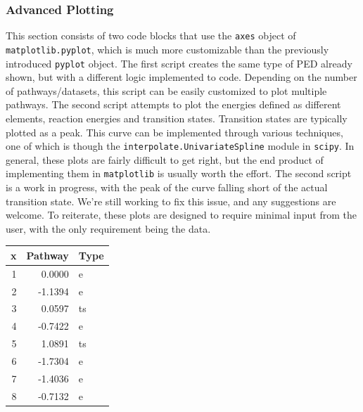 \documentclass[11pt]{article}
\begin{document}
\subsubsection{Advanced Plotting}
\label{sec:org0cb982b}
This section consists of two code blocks that use the \texttt{axes} object of \texttt{matplotlib.pyplot}, which is much more customizable than the previously introduced \texttt{pyplot} object. The first script creates the same type of PED already shown, but with a different logic implemented to code. Depending on the number of pathways/datasets, this script can be easily customized to plot multiple pathways. The second script attempts to plot the energies defined as different elements, reaction energies and transition states. Transition states are typically plotted as a peak. This curve can be implemented through various techniques, one of which is though the \texttt{interpolate.UnivariateSpline} module in \texttt{scipy}. In general, these plots are fairly difficult to get right, but the end product of implementing them in \texttt{matplotlib} is usually worth the effort. The second script is a work in progress, with the peak of the curve falling short of the actual transition state. We're still working to fix this issue, and any suggestions are welcome. To reiterate, these plots are designed to require minimal input from the user, with the only requirement being the data.

\begin{center}
\label{tab:orgbe4decd}
\begin{tabular}{rrl}
x & Pathway & Type\\
\hline
1 & 0.0000 & e\\
2 & -1.1394 & e\\
3 & 0.0597 & ts\\
4 & -0.7422 & e\\
5 & 1.0891 & ts\\
6 & -1.7304 & e\\
7 & -1.4036 & e\\
8 & -0.7132 & e\\
\end{tabular}
\end{center}
\end{document}
